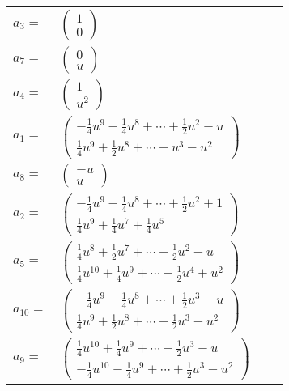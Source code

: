 \documentclass[1p]{elsarticle_modified}
\theoremstyle{definition}
\begin{document}
\begin{tabular}{m{7pt} m{180pt} m{7pt} m{180pt} }
\flushright $a_{3}=$&$\begin{pmatrix}1\\0\end{pmatrix}$ \\
\flushright $a_{7}=$&$\begin{pmatrix}0\\u\end{pmatrix}$ \\
\flushright $a_{4}=$&$\begin{pmatrix}1\\u^2\end{pmatrix}$ \\
\flushright $a_{1}=$&$\begin{pmatrix}-\frac{1}{4} u^9-\frac{1}{4} u^8+\cdots+\frac{1}{2} u^2- u\\\frac{1}{4} u^9+\frac{1}{2} u^8+\cdots- u^3- u^2\end{pmatrix}$ \\
\flushright $a_{8}=$&$\begin{pmatrix}- u\\u\end{pmatrix}$ \\
\flushright $a_{2}=$&$\begin{pmatrix}-\frac{1}{4} u^9-\frac{1}{4} u^8+\cdots+\frac{1}{2} u^2+1\\\frac{1}{4} u^9+\frac{1}{4} u^7+\frac{1}{4} u^5\end{pmatrix}$ \\
\flushright $a_{5}=$&$\begin{pmatrix}\frac{1}{4} u^8+\frac{1}{2} u^7+\cdots-\frac{1}{2} u^2- u\\\frac{1}{4} u^{10}+\frac{1}{4} u^9+\cdots-\frac{1}{2} u^4+u^2\end{pmatrix}$ \\
\flushright $a_{10}=$&$\begin{pmatrix}-\frac{1}{4} u^9-\frac{1}{4} u^8+\cdots+\frac{1}{2} u^3- u\\\frac{1}{4} u^9+\frac{1}{2} u^8+\cdots-\frac{1}{2} u^3- u^2\end{pmatrix}$ \\
\flushright $a_{9}=$&$\begin{pmatrix}\frac{1}{4} u^{10}+\frac{1}{4} u^9+\cdots-\frac{1}{2} u^3- u\\-\frac{1}{4} u^{10}-\frac{1}{4} u^9+\cdots+\frac{1}{2} u^3- u^2\end{pmatrix}$ \\

\end{tabular}
\end{document}
